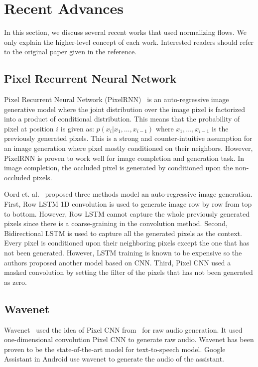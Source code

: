 \documentclass[runningheads]{llncs}
\begin{document}
\section{Recent Advances}
In this section, we discuss several recent works that used normalizing flows. We only explain the higher-level concept of each work. Interested readers should refer to the original paper given in the reference.
\subsection{Pixel Recurrent Neural Network}
Pixel Recurrent Neural Network (PixelRNN)~\cite{oord2016pixel} is an auto-regressive image generative model where the joint distribution over the image pixel is factorized into a product of conditional distribution. This means that the probability of pixel at position $i$ is given as: $p(x_i | x_1, \dots, x_{i-1})$ where $x_1, \dots, x_{i-1}$ is the previously generated pixels. This is a strong and counter-intuitive assumption for an image generation where pixel mostly conditioned on their neighbors. However, PixelRNN is proven to  work well for image completion and generation task. In image completion, the occluded pixel is generated by conditioned upon the non-occluded pixels.

Oord et. al.~\cite{oord2016pixel} proposed three methods model an auto-regressive image generation.  First, Row LSTM 1D convolution is used to generate image row by row from top to bottom. However, Row LSTM cannot capture the whole previously generated pixels since there is a coarse-graining in the convolution method. Second, Bidirectional LSTM is used to capture all the generated pixels as the context. Every pixel is conditioned upon their neighboring pixels except the one that has not been generated. However, LSTM training is known to be expensive so the authors proposed another model based on CNN. Third, Pixel CNN used a masked convolution by setting the filter of the pixels that has not been generated as zero.


\subsection{Wavenet}
Wavenet~\cite{van2016wavenet} used the idea of Pixel CNN from~\cite{oord2016pixel} for raw audio generation. It used one-dimensional convolution Pixel CNN to generate raw audio. Wavenet has been proven to be the state-of-the-art model for text-to-speech model. Google Assistant in Android use wavenet to generate the audio of the assistant. 
\end{document}
